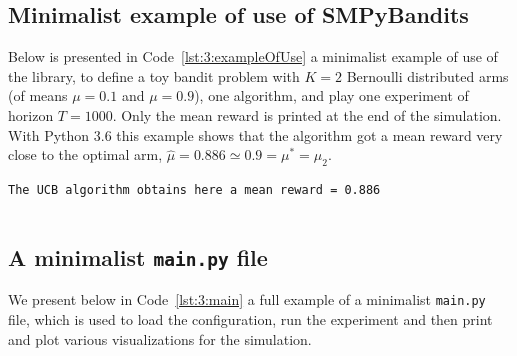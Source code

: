 \subsection{Minimalist example of use of SMPyBandits}
\label{sub:3:miniExampleSMPyBandits}

Below is presented in Code~\ref{lst:3:exampleOfUse} a minimalist example of use of the library, to define a toy bandit problem with $K=2$ Bernoulli distributed arms (of means $\mu=0.1$ and $\mu=0.9$), one \UCB{} algorithm, and play one experiment of horizon $T=1000$.
Only the mean reward is printed at the end of the simulation.
%
With Python 3.6 this example shows that the algorithm got a mean reward very close to the optimal arm, $\hat{\mu} = 0.886 \simeq 0.9 = \mu^* = \mu_2$.
\begin{verbatim}
The UCB algorithm obtains here a mean reward = 0.886
\end{verbatim}
%
\begin{small}
    \inputminted[linenos=true,numbersep=5pt,frame=lines,framesep=2mm]{python3}{2-Chapters/3-Chapter/src/example_of_use_of_SMPyBandits.py}
\end{small}


\subsection{A minimalist \texttt{main.py} file}
\label{sub:3:miniMainFileSMPyBandits}

We present below in Code~\ref{lst:3:main} a full example of a minimalist \texttt{main.py} file,
which is used to load the configuration, run the experiment and then print and plot various visualizations for the simulation.

\begin{small}
    \inputminted[linenos=true,numbersep=5pt,frame=lines,framesep=2mm]{python3}{2-Chapters/3-Chapter/src/example_of_main_singleplayer.py}
\end{small}



